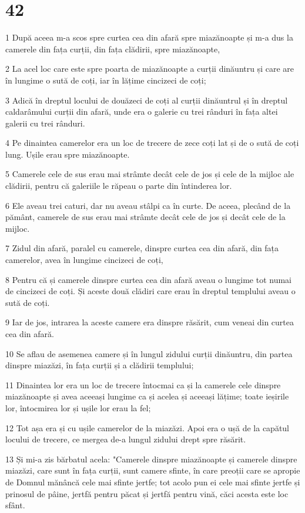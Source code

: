 \chapter{42}

\par 1 După aceea m-a scos spre curtea cea din afară spre miazănoapte și m-a dus la camerele din fața curții, din fața clădirii, spre miazănoapte,
\par 2 La acel loc care este spre poarta de miazănoapte a curții dinăuntru și care are în lungime o sută de coți, iar în lățime cincizeci de coți;
\par 3 Adică în dreptul locului de douăzeci de coți al curții dinăuntrul și în dreptul caldarâmului curții din afară, unde era o galerie cu trei rânduri în fața altei galerii cu trei rânduri.
\par 4 Pe dinaintea camerelor era un loc de trecere de zece coți lat și de o sută de coți lung. Ușile erau spre miazănoapte.
\par 5 Camerele cele de sus erau mai strâmte decât cele de jos și cele de la mijloc ale clădirii, pentru că galeriile le răpeau o parte din întinderea lor.
\par 6 Ele aveau trei caturi, dar nu aveau stâlpi ca în curte. De aceea, plecând de la pământ, camerele de sus erau mai strâmte decât cele de jos și decât cele de la mijloc.
\par 7 Zidul din afară, paralel cu camerele, dinspre curtea cea din afară, din fața camerelor, avea în lungime cincizeci de coți,
\par 8 Pentru că și camerele dinspre curtea cea din afară aveau o lungime tot numai de cincizeci de coți. Și aceste două clădiri care erau în dreptul templului aveau o sută de coți.
\par 9 Iar de jos, intrarea la aceste camere era dinspre răsărit, cum veneai din curtea cea din afară.
\par 10 Se aflau de asemenea camere și în lungul zidului curții dinăuntru, din partea dinspre miazăzi, în fața curții și a clădirii templului;
\par 11 Dinaintea lor era un loc de trecere întocmai ca și la camerele cele dinspre miazănoapte și avea aceeași lungime ca și acelea și aceeași lățime; toate ieșirile lor, întocmirea lor și ușile lor erau la fel;
\par 12 Tot așa era și cu ușile camerelor de la miazăzi. Apoi era o ușă de la capătul locului de trecere, ce mergea de-a lungul zidului drept spre răsărit.
\par 13 Și mi-a zis bărbatul acela: "Camerele dinspre miazănoapte și camerele dinspre miazăzi, care sunt în fața curții, sunt camere sfinte, în care preoții care se apropie de Domnul mănâncă cele mai sfinte jertfe; tot acolo pun ei cele mai sfinte jertfe și prinosul de pâine, jertfă pentru păcat și jertfă pentru vină, căci acesta este loc sfânt.
